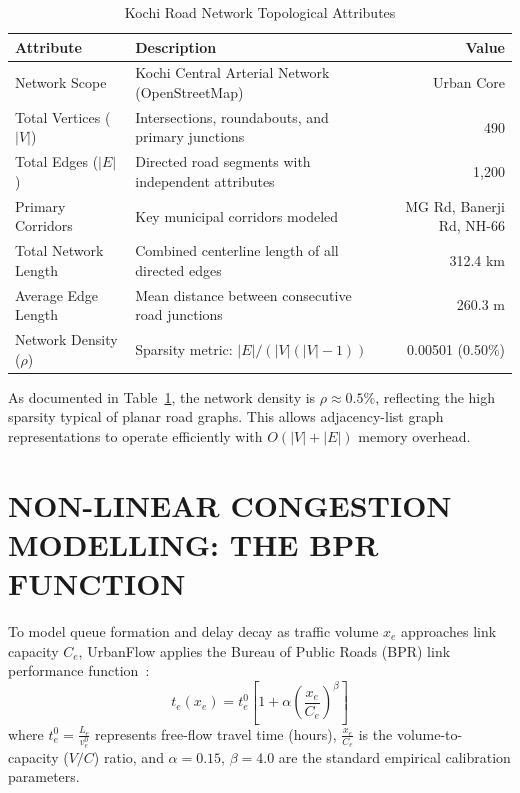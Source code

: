 \documentclass[12pt,a4paper]{report}
\begin{document}
\begin{table}[H]
\centering
\caption{Kochi Road Network Topological Attributes}
\label{tab:network_attributes}
\vspace{0.15cm}
\small
\begin{tabularx}{\textwidth}{lXr}
\toprule
\textbf{Attribute} & \textbf{Description} & \textbf{Value} \\
\midrule
Network Scope & Kochi Central Arterial Network (OpenStreetMap) & Urban Core \\
Total Vertices ($|V|$) & Intersections, roundabouts, and primary junctions & 490 \\
Total Edges ($|E|$) & Directed road segments with independent attributes & 1,200 \\
Primary Corridors & Key municipal corridors modeled & MG Rd, Banerji Rd, NH-66 \\
Total Network Length & Combined centerline length of all directed edges & 312.4 km \\
Average Edge Length & Mean distance between consecutive road junctions & 260.3 m \\
Network Density ($\rho$) & Sparsity metric: $|E| / (|V|(|V|-1))$ & 0.00501 (0.50\%) \\
\bottomrule
\end{tabularx}
\end{table}

As documented in Table~\ref{tab:network_attributes}, the network density is $\rho \approx 0.5\%$, reflecting the high sparsity typical of planar road graphs. This allows adjacency-list graph representations to operate efficiently with $O(|V| + |E|)$ memory overhead.

\section{NON-LINEAR CONGESTION MODELLING: THE BPR FUNCTION}
To model queue formation and delay decay as traffic volume $x_e$ approaches link capacity $C_e$, UrbanFlow applies the Bureau of Public Roads (BPR) link performance function~\cite{bpr1964}:
\begin{equation}
  t_e(x_e) = t_e^0 \left[ 1 + \alpha \left( \frac{x_e}{C_e} \right)^{\beta} \right]
  \label{eq:bpr}
\end{equation}
where $t_e^0 = \frac{L_e}{v_e^0}$ represents free-flow travel time (hours), $\frac{x_e}{C_e}$ is the volume-to-capacity ($V/C$) ratio, and $\alpha = 0.15$, $\beta = 4.0$ are the standard empirical calibration parameters.
\end{document}
